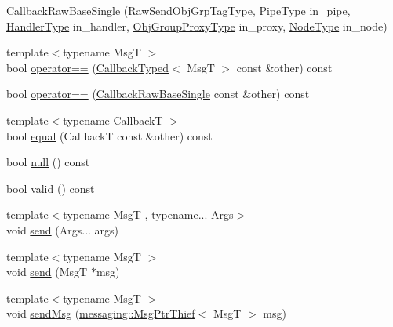 \begin{DoxyCompactItemize}
\item 
\hyperlink{structvt_1_1pipe_1_1callback_1_1cbunion_1_1_callback_raw_base_single_a8db688e82d3fb4d8f7f0a37817a0d929}{Callback\+Raw\+Base\+Single} (Raw\+Send\+Obj\+Grp\+Tag\+Type, \hyperlink{namespacevt_ac9852acda74d1896f48f406cd72c7bd3}{Pipe\+Type} in\+\_\+pipe, \hyperlink{namespacevt_af64846b57dfcaf104da3ef6967917573}{Handler\+Type} in\+\_\+handler, \hyperlink{namespacevt_ad7cae989df485fccca57f0792a880a8e}{Obj\+Group\+Proxy\+Type} in\+\_\+proxy, \hyperlink{namespacevt_a866da9d0efc19c0a1ce79e9e492f47e2}{Node\+Type} in\+\_\+node)
\item 
{\footnotesize template$<$typename MsgT $>$ }\\bool \hyperlink{structvt_1_1pipe_1_1callback_1_1cbunion_1_1_callback_raw_base_single_a0ed7e09c29d285f662731495b0a61ad0}{operator==} (\hyperlink{structvt_1_1pipe_1_1callback_1_1cbunion_1_1_callback_typed}{Callback\+Typed}$<$ MsgT $>$ const \&other) const
\item 
bool \hyperlink{structvt_1_1pipe_1_1callback_1_1cbunion_1_1_callback_raw_base_single_a875b9abe53b942d1e432beec980359e0}{operator==} (\hyperlink{structvt_1_1pipe_1_1callback_1_1cbunion_1_1_callback_raw_base_single}{Callback\+Raw\+Base\+Single} const \&other) const
\item 
{\footnotesize template$<$typename CallbackT $>$ }\\bool \hyperlink{structvt_1_1pipe_1_1callback_1_1cbunion_1_1_callback_raw_base_single_a5a2b870d980afbeb12ff2b708028cddc}{equal} (CallbackT const \&other) const
\item 
bool \hyperlink{structvt_1_1pipe_1_1callback_1_1cbunion_1_1_callback_raw_base_single_a69279b16198da6a06c5cfb28203c9819}{null} () const
\item 
bool \hyperlink{structvt_1_1pipe_1_1callback_1_1cbunion_1_1_callback_raw_base_single_ae71a381a339f3e46adea8f93a6726bd5}{valid} () const
\item 
{\footnotesize template$<$typename MsgT , typename... Args$>$ }\\void \hyperlink{structvt_1_1pipe_1_1callback_1_1cbunion_1_1_callback_raw_base_single_ad5eca450268d8d5c186019d8421f6335}{send} (Args... args)
\item 
{\footnotesize template$<$typename MsgT $>$ }\\void \hyperlink{structvt_1_1pipe_1_1callback_1_1cbunion_1_1_callback_raw_base_single_a4b09f1ec8917085ba9934764c16b29d6}{send} (MsgT $\ast$msg)
\item 
{\footnotesize template$<$typename MsgT $>$ }\\void \hyperlink{structvt_1_1pipe_1_1callback_1_1cbunion_1_1_callback_raw_base_single_a00c44780961d5d7e0085321872f5e805}{send\+Msg} (\hyperlink{structvt_1_1messaging_1_1_msg_ptr_thief}{messaging\+::\+Msg\+Ptr\+Thief}$<$ MsgT $>$ msg)

\end{DoxyCompactItemize}
